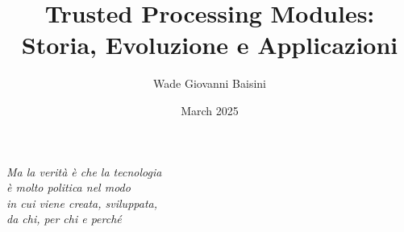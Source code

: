 \documentclass[a4paper,12pt]{report} %
\begin{document}

\title{Trusted Processing Modules: Storia, Evoluzione e Applicazioni}
\author{Wade Giovanni Baisini}
\date{March 2025}


\restoregeometry

\clearpage
\thispagestyle{empty} %

\vspace*{\fill} %

\begin{flushright}
  \itshape 
Ma la verità è che la tecnologia\\
è molto politica  \- nel modo\\
in cui viene creata, sviluppata,\\ 
da chi, per chi e perché\\
\end{flushright}

\vfill
\clearpage

\textwidth=450pt\oddsidemargin=0pt

\tableofcontents
\cleardoublepage
{}













\end{document}
